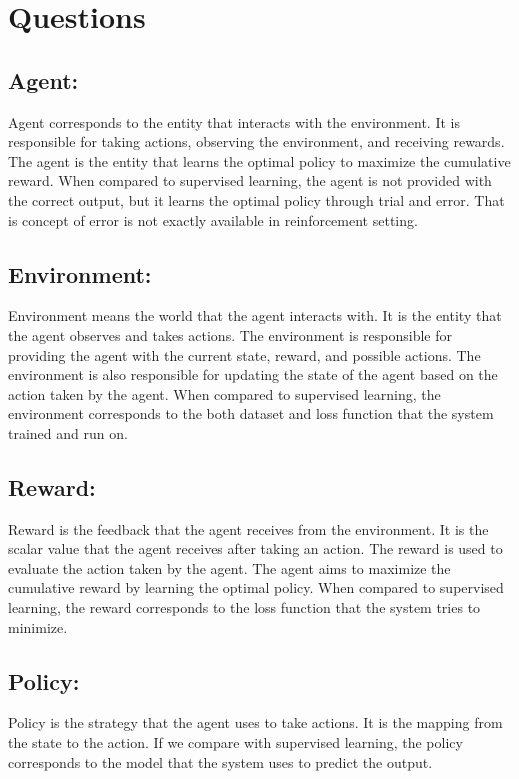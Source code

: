 \documentclass{assignment}
\date{\today}
\begin{document}
\section{Questions}
\subsection{Agent: }
Agent corresponds to the entity that interacts with the environment. It is responsible for taking actions, observing the environment, and receiving rewards. The agent is the entity that learns the optimal policy to maximize the cumulative reward. When compared to supervised learning, the agent is not provided with the correct output, but it learns the optimal policy through trial and error. That is concept of error is not exactly available in reinforcement setting.

\subsection{Environment: }
Environment means the world that the agent interacts with. It is the entity that the agent observes and takes actions. The environment is responsible for providing the agent with the current state, reward, and possible actions. The environment is also responsible for updating the state of the agent based on the action taken by the agent. When compared to supervised learning, the environment corresponds to the both dataset and loss function that the system trained and run on.

\subsection{Reward: }
Reward is the feedback that the agent receives from the environment. It is the scalar value that the agent receives after taking an action. The reward is used to evaluate the action taken by the agent. The agent aims to maximize the cumulative reward by learning the optimal policy. When compared to supervised learning, the reward corresponds to the loss function that the system tries to minimize.

\subsection{Policy: }
Policy is the strategy that the agent uses to take actions. It is the mapping from the state to the action. If we compare with supervised learning, the policy corresponds to the model that the system uses to predict the output.
\end{document}
